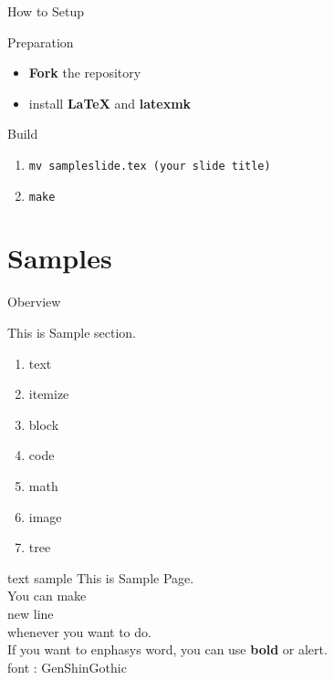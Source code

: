 \documentclass[aspectratio=1610,14pt]{beamer}
\begin{document}
\begin{frame}{How to Setup}
    \begin{textblock}{Preparation}
        \begin{itemize}
            \item{\textbf{Fork} the repository}
            \item{install \textbf{LaTeX} and \textbf{latexmk}}
        \end{itemize}
    \end{textblock}

    \begin{textblock}{Build}
        \begin{enumerate}
            \item{\lstinline|mv sampleslide.tex (your slide title)|}
            \item{\lstinline|make|}
        \end{enumerate}
    \end{textblock}
\end{frame}

\section{Samples}
\begin{frame}
    \tableofcontents[currentsection]
\end{frame}

\begin{frame}{Oberview}
    \begin{textblock}{This is Sample section.}
        \begin{enumerate}
            \item{text}
            \item{itemize}
            \item{block}
            \item{code}
            \item{math}
            \item{image} 
            \item{tree}
        \end{enumerate}
    \end{textblock}
\end{frame}

\begin{frame}{text sample}
    This is Sample Page.\\
    You can make \\
    \alert{new line}\\
    whenever you want to do.\\
    If you want to enphasys word, you can use \textbf{bold} or \alert{alert}. \\
    font : GenShinGothic
\end{frame}
\end{document}
